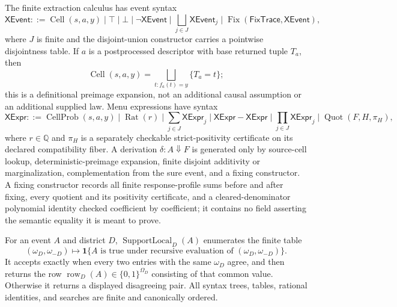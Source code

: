 The finite extraction calculus has event syntax
\[
\mathsf{XEvent}::=\operatorname{Cell}(s,a,y)\mid\top\mid\bot\mid
\neg\mathsf{XEvent}\mid\bigsqcup_{j\in J}\mathsf{XEvent}_j
\mid\operatorname{Fix}(\mathsf{FixTrace},\mathsf{XEvent}),
\]
where \(J\) is finite and the disjoint-union constructor carries a pointwise disjointness table.  If \(a\) is a postprocessed descriptor with base returned tuple \(T_a\), then
\[
\operatorname{Cell}(s,a,y)=\bigsqcup_{t:f_a(t)=y}\{T_a=t\};
\]
this is a definitional preimage expansion, not an additional causal assumption or an additional supplied law.  Menu expressions have syntax
\[
\mathsf{XExpr}::=\operatorname{CellProb}(s,a,y)\mid\operatorname{Rat}(r)
\mid\sum_{j\in J}\mathsf{XExpr}_j\mid\mathsf{XExpr}-\mathsf{XExpr}
\mid\prod_{j\in J}\mathsf{XExpr}_j
\mid\operatorname{Quot}(F,H,\pi_H),
\]
where \(r\in\mathbb Q\) and \(\pi_H\) is a separately checkable strict-positivity certificate on its declared compatibility fiber.  A derivation \(\delta:A\Downarrow F\) is generated only by source-cell lookup, deterministic-preimage expansion, finite disjoint additivity or marginalization, complementation from the sure event, and a fixing constructor.  A fixing constructor records all finite response-profile sums before and after fixing, every quotient and its positivity certificate, and a cleared-denominator polynomial identity checked coefficient by coefficient; it contains no field asserting the semantic equality it is meant to prove.

For an event \(A\) and district \(D\), \(\operatorname{SupportLocal}_D(A)\) enumerates the finite table
\[
(\omega_D,\omega_{-D})\longmapsto
\mathbf 1\{A\text{ is true under recursive evaluation of }(\omega_D,\omega_{-D})\}.
\]
It accepts exactly when every two entries with the same \(\omega_D\) agree, and then returns the row \(\operatorname{row}_D(A)\in\{0,1\}^{\Omega_D}\) consisting of that common value.  Otherwise it returns a displayed disagreeing pair.  All syntax trees, tables, rational identities, and searches are finite and canonically ordered.